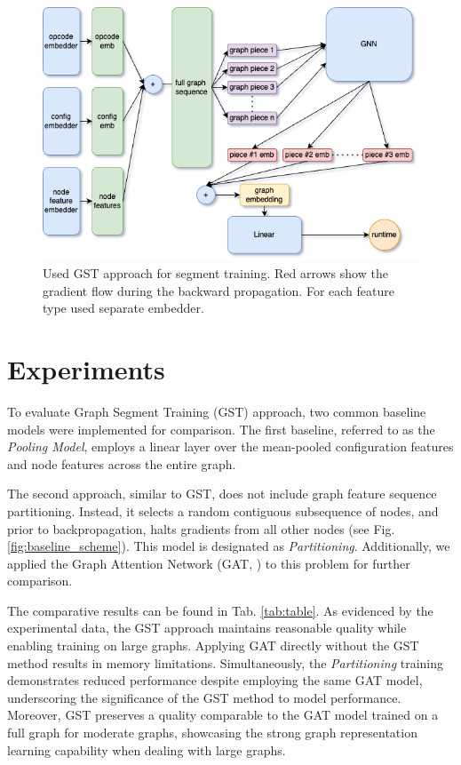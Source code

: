 \documentclass{article}
\begin{document}
\begin{figure}
\label{fig:main_schema}
    \centering
    \includegraphics[scale=0.6]{figures/main_schema.png}
    \caption{Used GST approach for segment training. Red arrows show the gradient flow during the backward propagation. For each feature type used separate embedder.}
\end{figure}
\section{Experiments}

To evaluate Graph Segment Training (GST) approach, two common baseline models were implemented for comparison. The first baseline, referred to as the \textit{Pooling Model}, employs a linear layer over the mean-pooled configuration features and node features across the entire graph.

The second approach, similar to GST, does not include graph feature sequence partitioning. Instead, it selects a random contiguous subsequence of nodes, and prior to backpropagation, halts gradients from all other nodes (see Fig. \ref{fig:baseline_scheme}). This model is designated as \textit{Partitioning}. Additionally, we applied the Graph Attention Network (GAT, \cite{velivckovic2017graph}) to this problem for further comparison.

The comparative results can be found in Tab. \ref{tab:table}. As evidenced by the experimental data, the GST approach maintains reasonable quality while enabling training on large graphs. Applying GAT directly without the GST method results in memory limitations. Simultaneously, the \textit{Partitioning} training demonstrates reduced performance despite employing the same GAT model, underscoring the significance of the GST method to model performance. Moreover, GST preserves a quality comparable to the GAT model trained on a full graph for moderate graphs, showcasing the strong graph representation learning capability when dealing with large graphs.
\end{document}
